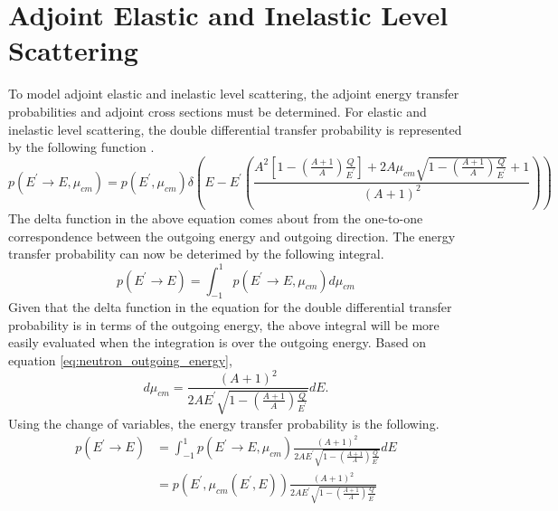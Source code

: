 \section{Adjoint Elastic and Inelastic Level Scattering}
To model adjoint elastic and inelastic level scattering, the adjoint energy
transfer probabilities and adjoint cross sections must be determined. For
elastic and inelastic level scattering, the double differential transfer
probability is represented by the following function 
\citep{hoogenboom_adjoint_1977}.
\begin{equation}
  p(E^{'} \to E, \mu_{cm}) = p(E^{'},\mu_{cm})\delta\left(E - 
  E^{'} \left(\frac{A^2\left[1-\left(\frac{A+1}{A}\right)\frac{Q}{E^{'}}
      \right]+ 2A\mu_{cm}\sqrt{1 - \left(\frac{A+1}{A}\right)\frac{Q}{E^{'}}}
     + 1}{\left(A+1\right)^2}\right)\right)
\end{equation}
The delta function in the above equation comes about from the one-to-one 
correspondence between the outgoing energy and outgoing direction. The energy
transfer probability can now be deterimed by the following integral.
\begin{equation}
  p(E^{'} \to E) = \int_{-1}^1 p(E^{'} \to E, \mu_{cm}) d\mu_{cm}
\end{equation}
Given that the delta function in the equation for the double differential
transfer probability is in terms of the outgoing energy, the above integral
will be more easily evaluated when the integration is over the outgoing energy.
Based on equation \ref{eq:neutron_outgoing_energy},
\begin{equation}
  d\mu_{cm} = \frac{(A+1)^2}{2AE^{'}\sqrt{1-\left(\frac{A+1}{A}\right)
      \frac{Q}{E^{'}}}} dE.
\end{equation}
Using the change of variables, the energy transfer probability is the following.
\begin{align}
  p(E^{'} \to E) & = \int_{-1}^1 p(E^{'} \to E, \mu_{cm}) 
  \frac{(A+1)^2}{2AE^{'}\sqrt{1-\left(\frac{A+1}{A}\right)\frac{Q}{E^{'}}}} dE
  \nonumber \\
  & = p(E^{'}, \mu_{cm}(E^{'},E)) 
  \frac{(A+1)^2}{2AE^{'}\sqrt{1-\left(\frac{A+1}{A}\right)\frac{Q}{E^{'}}}}
\end{align}

